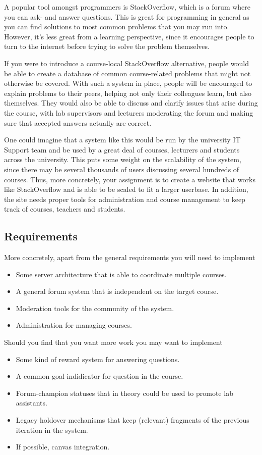 \begin{refsection}
A popular tool amongst programmers is StackOverflow, which is a forum where you can ask- and answer questions. This is great for programming in general as you can find solutions to most common problems that you may run into. However, it's less great from a learning perspective, since it encourages people to turn to the internet before trying to solve the problem themselves.

If you were to introduce a course-local StackOverflow alternative, people would be able to create a database of common course-related problems that might not otherwise be covered. With such a system in place, people will be encouraged to explain problems to their peers, helping not only their colleagues learn, but also themselves. They would also be able to discuss and clarify issues that arise during the course, with lab supervisors and lecturers moderating the forum and making sure that accepted answers actually are correct.

One could imagine that a system like this would be run by the university IT Support team and be used by a great deal of courses, lecturers and students across the university. This puts some weight on the scalability of the system, since there may be several thousands of users discussing several hundreds of courses. Thus, more concretely, your assignment is to create a website that works like StackOverflow and is able to be scaled to fit a larger userbase. In addition, the site needs proper tools for administration and course management to keep track of courses, teachers and students.

\subsection{Requirements}
More concretely, apart from the general requirements you will need to implement
\begin{itemize}
    \item Some server architecture that is able to coordinate multiple courses.
    \item A general forum system that is independent on the target course.
    \item Moderation tools for the community of the system.
    \item Administration for managing courses.
\end{itemize}
Should you find that you want more work you may want to implement
\begin{itemize}
    \item Some kind of reward system for answering questions.
    \item A common goal indidicator for question in the course.
    \item Forum-champion statuses that in theory could be used to promote lab assistants.
    \item Legacy holdover mechanisms that keep (relevant) fragments of the previous iteration in the system.
    \item If possible, canvas integration.
\end{itemize}

\end{refsection}
